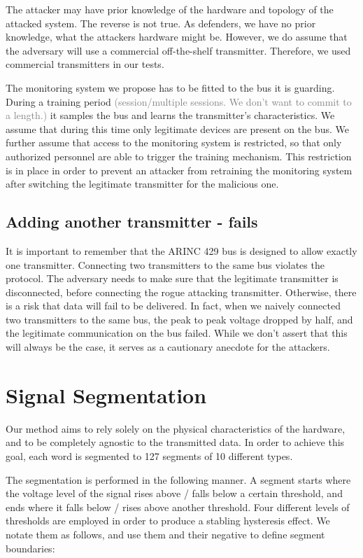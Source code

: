 \documentclass[conference]{IEEEtran}
\begin{document}
  The attacker may have prior knowledge of the hardware and topology of the attacked system. The reverse is not true. As defenders, we have no prior knowledge, what the attackers hardware might be. However, we do assume that the adversary will use a commercial off-the-shelf transmitter. Therefore, we used commercial transmitters in our tests.

  The monitoring system we propose has to be fitted to the bus it is guarding. During a training period \textcolor{gray}{(session/multiple sessions. We don't want to commit to a length.)} it samples the bus and learns the transmitter's characteristics. We assume that during this time only legitimate devices are present on the bus. We further assume that access to the monitoring system is restricted, so that only authorized personnel are able to trigger the training mechanism. This restriction is in place in order to prevent an attacker from retraining the monitoring system after switching the legitimate transmitter for the malicious one. 

\subsection{Adding another transmitter - fails}
  It is important to remember that the ARINC 429 bus is designed to allow exactly one transmitter. Connecting two transmitters to the same bus violates the protocol. The adversary needs to make sure that the legitimate transmitter is disconnected, before connecting the rogue attacking transmitter. Otherwise, there is a risk that data will fail to be delivered. In fact, when we naively connected two transmitters to the same bus, the peak to peak voltage dropped by half, and the legitimate communication on the bus failed. While we don't assert that this will always be the case, it serves as a cautionary anecdote for the attackers.

\section{Signal Segmentation}
  Our method aims to rely solely on the physical characteristics of the hardware, and to be completely agnostic to the transmitted data. In order to achieve this goal, each word is segmented to 127 segments of 10 different types.
  
  The segmentation is performed in the following manner. A segment starts where the voltage level of the signal rises above / falls below a certain threshold, and ends where it falls below / rises above another threshold. Four different levels of thresholds are employed in order to produce a stabling hysteresis effect. We notate them as follows, and use them and their negative to define segment boundaries:
  
\end{document}
